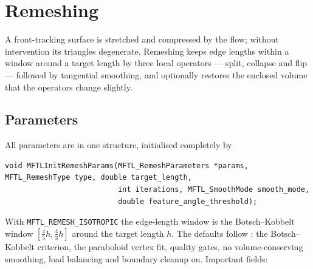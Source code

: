 \chapter{Remeshing}
\label{ch:remeshing}

A front-tracking surface is stretched and compressed by the flow; without intervention its
triangles degenerate. Remeshing keeps edge lengths within a window around a target length by
three local operators --- split, collapse and flip --- followed by tangential smoothing, and
optionally restores the enclosed volume that the operators change slightly.

\section{Parameters}

All parameters are in one structure, initialised completely by
\begin{lstlisting}[numbers=none]
void MFTLInitRemeshParams(MFTL_RemeshParameters *params, MFTL_RemeshType type, double target_length,
                          int iterations, MFTL_SmoothMode smooth_mode,
                          double feature_angle_threshold);
\end{lstlisting}
With \texttt{MFTL\_REMESH\_ISOTROPIC} the edge-length window is the Botsch--Kobbelt window
$[\tfrac45 h,\tfrac43 h]$ around the target length $h$. The defaults follow \mftlone: the
Botsch--Kobbelt criterion, the paraboloid vertex fit, quality gates, no volume-conserving
smoothing, load balancing and boundary cleanup on. Important fields:
